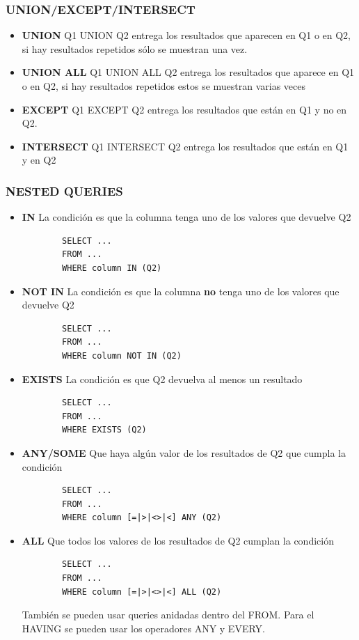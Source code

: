 \documentclass[11pt,letterpaper]{article}
\begin{document}
\subsubsection{UNION/EXCEPT/INTERSECT}
\begin{itemize}
	\item \textbf{UNION} Q1 UNION Q2 entrega los resultados que aparecen en Q1 o en Q2, si hay resultados repetidos sólo se muestran una vez.
	\item \textbf{UNION ALL} Q1 UNION ALL Q2 entrega los resultados que aparece en Q1 o en Q2, si hay resultados repetidos estos se muestran varias veces
	\item \textbf{EXCEPT} Q1 EXCEPT Q2 entrega los resultados que están en Q1 y no en Q2.
	\item \textbf{INTERSECT} Q1 INTERSECT Q2 entrega los resultados que están en Q1 y en Q2
\end{itemize}
\subsubsection{NESTED QUERIES}
\begin{itemize}
	\item \textbf{IN} La condición es que la columna tenga uno de los valores que devuelve Q2
	\begin{lstlisting}
		SELECT ...
		FROM ...
		WHERE column IN (Q2)
	\end{lstlisting}
	\item \textbf{NOT IN} La condición es que la columna \textbf{no} tenga uno de los valores que devuelve Q2
	\begin{lstlisting}
		SELECT ...
		FROM ...
		WHERE column NOT IN (Q2)
	\end{lstlisting}
	\item \textbf{EXISTS} La condición es que Q2 devuelva al menos un resultado
		\begin{lstlisting}
		SELECT ...
		FROM ...
		WHERE EXISTS (Q2)
	\end{lstlisting}
	\item \textbf{ANY/SOME} Que haya algún valor de los resultados de Q2 que cumpla la condición
	\begin{lstlisting}
		SELECT ...
		FROM ...
		WHERE column [=|>|<>|<] ANY (Q2)
	\end{lstlisting}
	\item \textbf{ALL} Que todos los valores de los resultados de Q2 cumplan la condición
	\begin{lstlisting}
		SELECT ...
		FROM ...
		WHERE column [=|>|<>|<] ALL (Q2)
	\end{lstlisting}
	
	También se pueden usar queries anidadas dentro del FROM. Para el HAVING se pueden usar los operadores ANY y EVERY.
\end{itemize}
\end{document}
